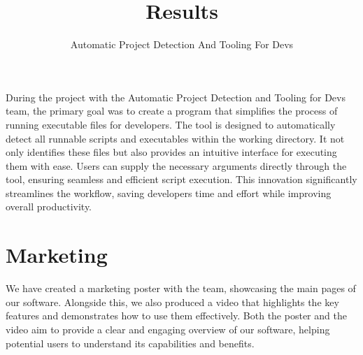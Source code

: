 \documentclass{article}
\title{Results}
\author{Automatic Project Detection And Tooling For Devs}
\date{}
\begin{document}
\maketitle

\clearpage

During the project with the Automatic Project Detection and Tooling for Devs team, the primary goal was to create a program that simplifies the process of running executable files for developers. The tool is designed to automatically detect all runnable scripts and executables within the working directory. It not only identifies these files but also provides an intuitive interface for executing them with ease. Users can supply the necessary arguments directly through the tool, ensuring seamless and efficient script execution. This innovation significantly streamlines the workflow, saving developers time and effort while improving overall productivity.

\section{Marketing}

We have created a marketing poster with the team, showcasing the main pages of our software. Alongside this, we also produced a video that highlights the key features and demonstrates how to use them effectively. Both the poster and the video aim to provide a clear and engaging overview of our software, helping potential users to understand its capabilities and benefits.
\end{document}
